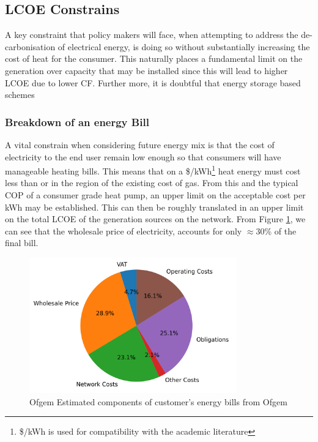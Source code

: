 \documentclass[11pt]{article}
\numberwithin{equation}{section}
\begin{document}
\subsection{LCOE Constrains}
\label{sec:orgc91ccba}
A key constraint that policy makers will face, when attempting to address the de-carbonisation of electrical energy, is doing so without substantially increasing the cost of heat for the consumer. This naturally places a fundamental limit on the generation over capacity that may be installed since this will lead to higher LCOE due to lower CF. Further more, it is doubtful that energy storage based schemes

\subsubsection{Breakdown of an energy Bill}
\label{sec:orga73b214}
A vital constrain when considering future energy mix is that the cost of electricity to the end user remain low enough so that consumers will have manageable heating bills. This means that on a \$/kWh\footnote{\$/kWh is used for compatibility with the academic literature} heat energy must cost less than or in the region of the existing cost of gas. From this and the typical COP of a consumer grade heat pump, an upper limit on the acceptable cost per kWh may be established. This can then be roughly translated in an upper limit on the total LCOE of the generation sources on the network. From Figure \ref{figPieBillBreakdown}, we can see that the wholesale price of electricity, accounts for only \(\approx\)30\% of the final bill.

\begin{figure}[H]
\centering
\includegraphics[width=0.8\textwidth]{./.ob-jupyter/78297f61231fd227439826e32eae830f0efb85e3.png}
\caption{\label{figPieBillBreakdown}Ofgem Estimated components of customer's energy bills from Ofgem \cite{ofgemBillBreakdown}}
\end{figure}
\end{document}
